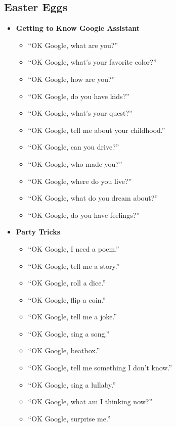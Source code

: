 \documentclass[
  jou,
  floatsintext,
  longtable,
  a4paper,
  nolmodern,
  notxfonts,
  notimes,
  colorlinks=true,linkcolor=blue,citecolor=blue,urlcolor=blue]{apa7}
\providecommand{\tightlist}{%
  \setlength{\itemsep}{0pt}\setlength{\parskip}{0pt}}
\begin{document}
\subsection{Easter Eggs}\label{easter-eggs}

\begin{itemize}
\tightlist
\item
  \textbf{Getting to Know Google Assistant}

  \begin{itemize}
  \tightlist
  \item
    ``OK Google, what are you?''
  \item
    ``OK Google, what's your favorite color?''
  \item
    ``OK Google, how are you?''
  \item
    ``OK Google, do you have kids?''
  \item
    ``OK Google, what's your quest?''
  \item
    ``OK Google, tell me about your childhood.''
  \item
    ``OK Google, can you drive?''
  \item
    ``OK Google, who made you?''
  \item
    ``OK Google, where do you live?''
  \item
    ``OK Google, what do you dream about?''
  \item
    ``OK Google, do you have feelings?''
  \end{itemize}
\item
  \textbf{Party Tricks}

  \begin{itemize}
  \tightlist
  \item
    ``OK Google, I need a poem.''
  \item
    ``OK Google, tell me a story.''
  \item
    ``OK Google, roll a dice.''
  \item
    ``OK Google, flip a coin.''
  \item
    ``OK Google, tell me a joke.''
  \item
    ``OK Google, sing a song.''
  \item
    ``OK Google, beatbox.''
  \item
    ``OK Google, tell me something I don't know.''
  \item
    ``OK Google, sing a lullaby.''
  \item
    ``OK Google, what am I thinking now?''
  \item
    ``OK Google, surprise me.''
  \end{itemize}
\end{itemize}
\end{document}
